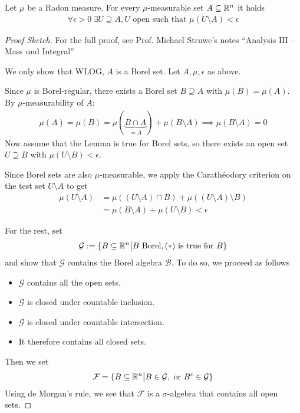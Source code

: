 \begin{lem}[]
Let $\mu$ be a Radon measure.
For every $\mu$-measurable set $A \subseteq \mathbb{R}^{n}$ it holds
\begin{align*}
  \forall  \epsilon > 0\ \exists U \supseteq A, U \text{ open such that } \mu(U \setminus A) < \epsilon \tag{$\ast$}
\end{align*}
\end{lem}
\begin{proof}[Proof Sketch]

  For the full proof, see Prof. Michael Struwe's notes ``Analysis III -- Mass und Integral''

  We only show that WLOG, $A$ is a Borel set. Let $A,\mu,\epsilon$ as above.

  Since $\mu$ is Borel-regular, there exists a Borel set $B \supseteq A$ with $\mu(B) = \mu(A)$.
  By $\mu$-measurability of $A$:
  \begin{align*}
    \mu(A) =
    \mu(B) = \mu(\underbrace{B \cap A}_{=A}) + \mu(B \setminus A) \implies \mu(B \setminus A) = 0
  \end{align*}
  Now assume that the Lemma is true for Borel sets, so there exists an open set $U \supseteq B$ with $\mu(U \setminus B) < \epsilon$.
  
  Since Borel sets are also $\mu$-measurable, we apply the Carathéodory criterion on the test set $U \setminus A$ to get
  \begin{align*}
    \mu(U \setminus A) 
    &= \mu((U \setminus A) \cap B) + \mu((U \setminus A) \setminus B)\\
    &= \mu(B \setminus A) + \mu(U \setminus B) < \epsilon
  \end{align*}


  For the rest, set
  \begin{align*}
    \mathcal{G} := \{B \subseteq \mathbb{R}^{n} \big\vert B \text{ Borel}, (\ast) \text{ is true for $B$}\}
  \end{align*}
  and show that $\mathcal{G}$ contains the Borel algebra $\mathcal{B}$.
  To do so, we proceed as follows
  \begin{itemize}
    \item $\mathcal{G}$ contains all the open sets.
    \item $\mathcal{G}$ is closed under countable inclusion.
    \item $\mathcal{G}$ is closed under countable intersection.
    \item It therefore contains all closed sets.
  \end{itemize}
  Then we set
  \begin{align*}
    \mathcal{F} = \{B \subseteq \mathbb{R}^{n} \big\vert B \in \mathcal{G}, \text{ or } B^{c} \in \mathcal{G}\}
  \end{align*}
  Using de Morgan's rule, we see that 
  $\mathcal{F}$ is a $\sigma$-algebra that contains all open sets.
\end{proof}

